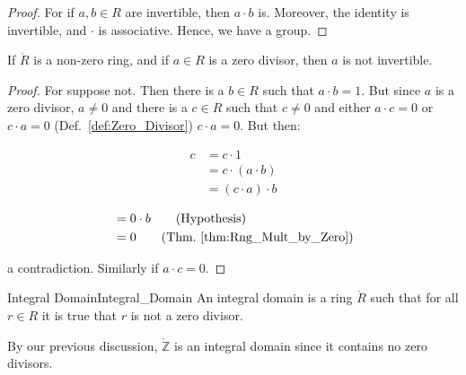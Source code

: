 \documentclass{article}                                                        %
\begin{document}
        \begin{proof}
            For if $a,b\in{R}$ are invertible, then $a\cdot{b}$ is. Moreover,
            the identity is invertible, and $\cdot$ is associative. Hence, we
            have a group.
        \end{proof}
        \begin{theorem}
            \label{thm:Ring_Zero_Divisor_Not_Invertible}%
            If $\ring{R}$ is a non-zero ring, and if $a\in{R}$ is a zero
            divisor, then $a$ is not invertible.
        \end{theorem}
        \begin{proof}
            For suppose not. Then there is a $b\in{R}$ such that $a\cdot{b}=1$.
            But since $a$ is a zero divisor, $a\ne{0}$ and there is a $c\in{R}$
            such that $c\ne{0}$ and either $a\cdot{c}=0$ or $c\cdot{a}=0$
            (Def.~\ref{def:Zero_Divisor}) $c\cdot{a}=0$. But then:
            \par
            \begin{minipage}[t]{0.49\textwidth}
                \begin{align*}
                    c&=c\cdot{1}\tag{Identity}\\
                    &=c\cdot(a\cdot{b})\tag{Inverse}\\
                    &=(c\cdot{a})\cdot{b}\tag{Associativity}
                \end{align*}
            \end{minipage}
            \hfill
            \begin{minipage}[t]{0.49\textwidth}
                \centering
                \begin{align*}
                    &=0\cdot{b}\tag{Hypothesis}\\
                    &=0\tag{Thm.~\ref{thm:Rng_Mult_by_Zero}}
                \end{align*}
            \end{minipage}
            \par\vspace{2.5ex}
            a contradiction. Similarly if $a\cdot{c}=0$.
        \end{proof}
        \begin{fdefinition}{Integral Domain}{Integral_Domain}
            An integral domain is a ring $\ring{R}$ such that for all $r\in{R}$
            it is true that $r$ is not a zero divisor.
        \end{fdefinition}
        \begin{example}
            By our previous discussion, $\ring{\mathbb{Z}}$ is an integral
            domain since it contains no zero divisors.
        \end{example}
\end{document}
